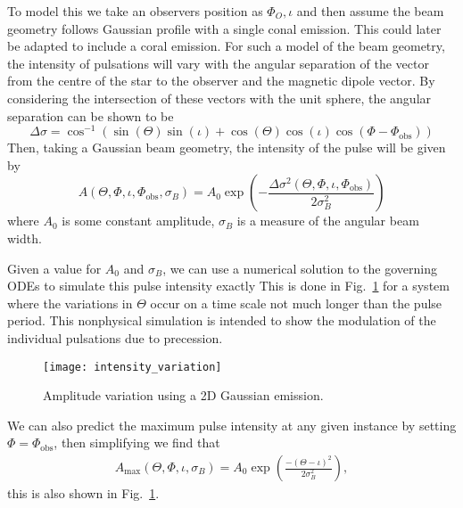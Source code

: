 \documentclass[../full_thesis/full_thesis.tex]{subfiles}
\begin{document}
To model this we take an observers position as $\Phi_{O}, \iota$ and then
assume the beam geometry follows Gaussian profile with a single conal emission.
This could later be adapted to include a coral emission.  For such a model of
the beam geometry, the intensity of pulsations will vary with the angular
separation of the vector from the centre of the star to the observer and the
magnetic dipole vector. By considering the intersection of these vectors with
the unit sphere, the angular separation can be shown to be
\newcommand{\ThetaO}{\Theta_{\mathrm{obs}}}
\newcommand{\PhiO}{\Phi_{\mathrm{obs}}} \newcommand{\sigmaB}{\sigma_{B}}
\begin{equation}
\Delta\sigma = \cos^{-1}\left(\sin(\Theta)\sin(\iota) +
                             \cos(\Theta)\cos(\iota)\cos(\Phi - \PhiO)\right)
\label{eqn: angular sep inv cos}
\end{equation}
Then, taking a Gaussian beam geometry, the intensity of the pulse will be given by
\begin{equation}
A(\Theta, \Phi, \iota, \PhiO, \sigmaB) =
A_{0} \exp\left(-\frac{\Delta\sigma^{2}(\Theta, \Phi, \iota, \PhiO)}{2\sigmaB^{2}}\right)
\label{eqn: gaussian beam intensity}
\end{equation}
where $A_{0}$ is some constant amplitude, $\sigmaB$ is a measure of the
angular beam width.

Given a value for $A_0$ and $\sigmaB$, we can use a numerical solution to the
governing ODEs to simulate this pulse intensity exactly This is done in
Fig.~\ref{fig: intensity variation} for a system where the variations in
$\Theta$ occur on a time scale not much longer than the pulse period. This
nonphysical simulation is intended to show the modulation of the individual
pulsations due to precession.
\begin{figure}[htb]
\centering
\texttt{[image: intensity\_variation]}
\caption{Amplitude variation using a 2D Gaussian emission.}
\label{fig: intensity variation}
\end{figure}
We can also predict the maximum pulse intensity at any given instance by setting
$\Phi=\PhiO$, then simplifying we find that
\begin{align}
A_{\mathrm{max}}(\Theta, \Phi, \iota, \sigmaB) =
A_{0}\exp\left(\frac{-(\Theta-\iota)^{2}}{2\sigmaB^{2}}\right),
\label{eqn: A max}
\end{align}
this is also shown in Fig.~\ref{fig: intensity variation}.
\end{document}
